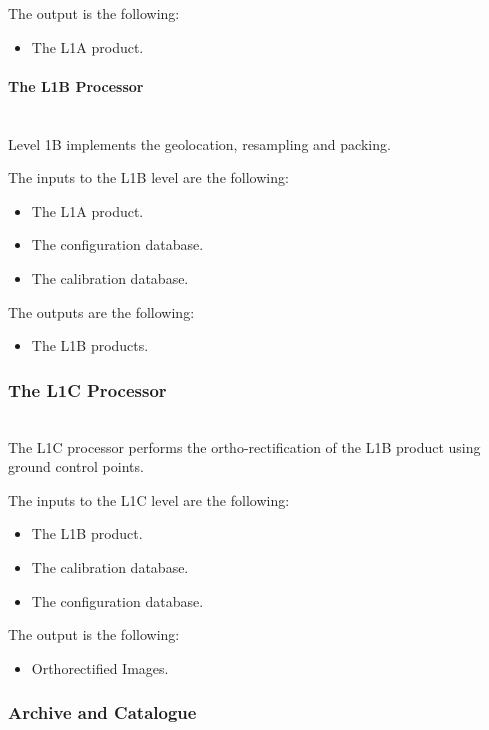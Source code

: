 The output is the following:
\begin{itemize}
\item The L1A product.
\end{itemize}

\paragraph{The L1B Processor}~\\

Level 1B implements the geolocation, resampling and packing.

The inputs to the L1B level are the following:
\begin{itemize}
\item The L1A product.
\item The configuration database.
\item The calibration database.
\end{itemize}

The outputs are the following:
\begin{itemize}
\item The L1B products.
\end{itemize}


\subsubsection{The L1C Processor}~\\

The L1C processor performs the ortho-rectification of the L1B product using ground control points.

The inputs to the L1C level are the following:
\begin{itemize}
\item The L1B  product.
\item The calibration database.
\item The configuration database.
\end{itemize}

The output is the following:
\begin{itemize}
\item Orthorectified Images.
\end{itemize}




\subsubsection{Archive and Catalogue}
\label{sub:archive}

